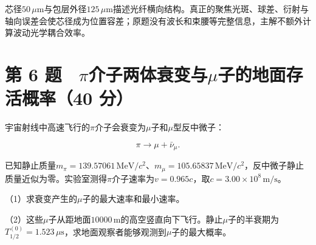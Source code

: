 \documentclass[12pt,a4paper,fontset=fandol]{ctexart}
\begin{document}
芯径\(50\,\mu\mathrm m\)与包层外径\(125\,\mu\mathrm m\)描述光纤横向结构。真正的聚焦光斑、球差、衍射与轴向误差会使芯径成为位置容差；原题没有波长和束腰等完整信息，主解不额外计算波动光学耦合效率。

\clearpage

\section{\texorpdfstring{第 6
题　\(\pi\)介子两体衰变与\(\mu\)子的地面存活概率（40
分）}{第 6 题　\textbackslash pi介子两体衰变与\textbackslash mu子的地面存活概率（40 分）}}\label{ux7b2c-6-ux9898-piux4ecbux5b50ux4e24ux4f53ux8870ux53d8ux4e0emuux5b50ux7684ux5730ux9762ux5b58ux6d3bux6982ux738740-ux5206}

宇宙射线中高速飞行的\(\pi\)介子会衰变为\(\mu\)子和\(\mu\)型反中微子：

\[
\pi\longrightarrow\mu+\bar\nu_\mu.
\]

已知静止质量\(m_\pi=139.57061\,\mathrm{MeV}/c^2\)、\(m_\mu=105.65837\,\mathrm{MeV}/c^2\)，反中微子静止质量近似为零。实验室测得\(\pi\)介子速率为\(v=0.965c\)，取\(c=3.00\times10^8\,\mathrm{m/s}\)。

\begin{center}
\begin{minipage}{\linewidth}
\centering\begingroup{}
\ifdim\wd\diagrambox>.88\linewidth
\sbox{\diagrambox}{\resizebox{.88\linewidth}{!}{\usebox{\diagrambox}}}\fi
\ifdim\ht\diagrambox>.38\textheight
\resizebox{!}{.38\textheight}{\usebox{\diagrambox}}
\else\usebox{\diagrambox}\fi
\par{}\endgroup\end{minipage}\end{center}

（1）求衰变产生的\(\mu\)子的最大速率和最小速率。

（2）这些\(\mu\)子从距地面\(10000\,\mathrm m\)的高空竖直向下飞行。静止\(\mu\)子的半衰期为\(T_{1/2}^{(0)}=1.523\,\mu\mathrm s\)，求地面观察者能够观测到\(\mu\)子的最大概率。
\end{document}
